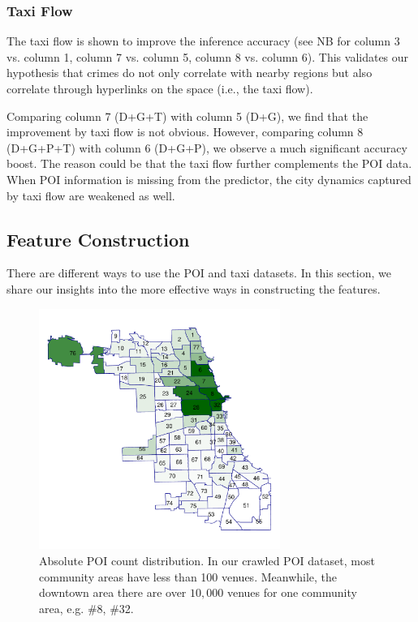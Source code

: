 \vspace{2mm}
\subsubsection{Taxi Flow} 
The taxi flow is shown to improve the inference accuracy (see NB for column 3 vs. column 1, column 7 vs. column 5, column 8 vs. column 6). 
This validates our hypothesis that crimes do not only correlate with nearby regions but also correlate through hyperlinks on the space (i.e., the taxi flow). 

Comparing column 7 (D+G+T) with column 5 (D+G), we find that the improvement by taxi flow is not obvious. However, comparing column 8 (D+G+P+T) with column 6 (D+G+P), we observe a much significant accuracy boost. The reason could be that the taxi flow further complements the POI data. When POI information is missing from the predictor, the city dynamics captured by taxi flow are weakened as well.


\vspace{4mm}
\subsection{Feature Construction}


There are different ways to use the POI and taxi datasets. In this section, we share our insights into the more effective ways in constructing the features. 

\begin{figure}[t]
\centering
\includegraphics[width=0.7\textwidth]{fig/poi-cnt3.pdf}
\caption{Absolute POI count distribution. In our crawled POI dataset, most community areas have less than 100 venues. Meanwhile, the downtown area there are over $10,000$ venues for one community area, e.g. \#8, \#32.}
\label{fig:poi-dist}
\end{figure}

